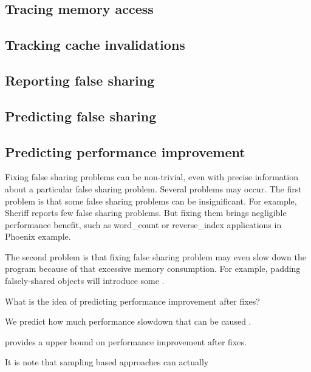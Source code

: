 \label{sec:implement}

\subsection{Tracing memory access}
\subsection{Tracking cache invalidations}
\subsection{Reporting false sharing}
\subsection{Predicting false sharing}
\subsection{Predicting performance improvement}

Fixing false sharing problems can be non-trivial, even with precise information about a particular false sharing problem. Several problems may occur. 
The first problem is that some false sharing problems can be insignificant. 
For example, Sheriff reports few false sharing problems. But fixing them brings negligible performance benefit, such as word\_count or reverse\_index applications in Phoenix example. 

The second problem is that fixing false sharing problem may even slow down the program because of that excessive memory consumption. For example, padding falsely-shared objects will introduce some . 

What is the idea of predicting performance improvement after fixes?  

We predict how much performance slowdown that can be caused . 

\cheetah{} provides a upper bound on performance improvement after fixes. 

It is note that sampling based approaches can actually 
 